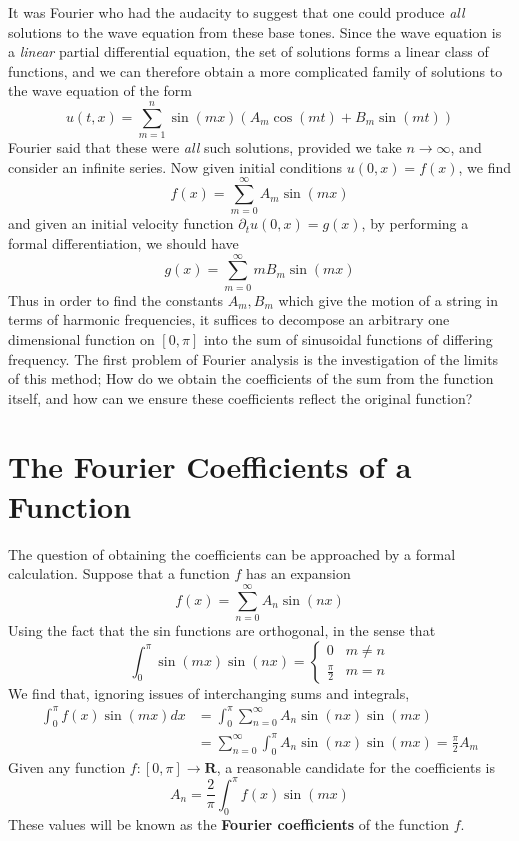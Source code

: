 It was Fourier who had the audacity to suggest that one could produce {\it all} solutions to the wave equation from these base tones. Since the wave equation is a {\it linear} partial differential equation, the set of solutions forms a linear class of functions, and we can therefore obtain a more complicated family of solutions to the wave equation of the form
%
\[ u(t,x) = \sum_{m = 1}^n \sin(mx) (A_m \cos(mt) + B_m \sin(mt)) \]
%
Fourier said that these were {\it all} such solutions, provided we take $n \to \infty$, and consider an infinite series. Now given initial conditions $u(0,x) = f(x)$, we find
%
\[ f(x) = \sum_{m = 0}^\infty A_m \sin(mx) \]
%
and given an initial velocity function $\partial_t u(0,x) = g(x)$, by performing a formal differentiation, we should have
%
\[ g(x) = \sum_{m = 0}^\infty m B_m \sin(mx) \]
%
Thus in order to find the constants $A_m,B_m$ which give the motion of a string in terms of harmonic frequencies, it suffices to decompose an arbitrary one dimensional function on $[0,\pi]$ into the sum of sinusoidal functions of differing frequency. The first problem of Fourier analysis is the investigation of the limits of this method; How do we obtain the coefficients of the sum from the function itself, and how can we ensure these coefficients reflect the original function?

\section{The Fourier Coefficients of a Function}

The question of obtaining the coefficients can be approached by a formal calculation. Suppose that a function $f$ has an expansion
%
\[ f(x) = \sum_{n = 0}^\infty A_n \sin(nx) \]
%
Using the fact that the sin functions are orthogonal, in the sense that
%
\[ \int_0^\pi \sin(mx) \sin(nx) = \begin{cases} 0 & m \neq n \\ \frac{\pi}{2} & m = n \end{cases} \]
%
We find that, ignoring issues of interchanging sums and integrals,
%
\begin{align*}
    \int_0^\pi f(x) \sin(mx) dx &= \int_0^\pi \sum_{n = 0}^\infty A_n \sin(nx) \sin(mx)\\
    &= \sum_{n = 0}^\infty \int_0^\pi A_n \sin(nx) \sin(mx) = \frac{\pi}{2} A_m
\end{align*}
%
Given any function $f:[0,\pi] \to \mathbf{R}$, a reasonable candidate for the coefficients is
%
\[ A_n = \frac{2}{\pi} \int_0^\pi f(x) \sin(mx) \]
%
These values will be known as the {\bf Fourier coefficients} of the function $f$.

